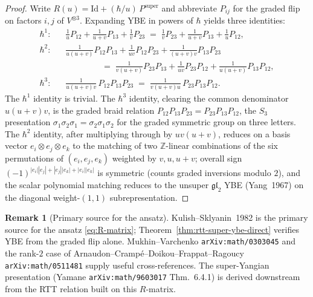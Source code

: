 \documentclass[11pt]{amsart}
\theoremstyle{definition}
\newtheorem{remark}[theorem]{Remark}
\providecommand{\bZ}{\mathbb{Z}}
\providecommand{\fgl}{\mathfrak{gl}}
\begin{document}
\begin{proof}
Write $R(u) = \mathrm{Id} + (\hbar/u)\, P^{\mathrm{super}}$ and abbreviate
$P_{ij}$ for the graded flip on factors $i, j$ of $V^{\otimes 3}$.
Expanding YBE in powers of $\hbar$ yields three identities:
\begin{align*}
\text{$\hbar^1$:}\quad &
  \tfrac{1}{u}P_{12} + \tfrac{1}{u+v}P_{13} + \tfrac{1}{v}P_{23}
  \;=\;
  \tfrac{1}{v}P_{23} + \tfrac{1}{u+v}P_{13} + \tfrac{1}{u}P_{12},
\\
\text{$\hbar^2$:}\quad &
  \tfrac{1}{u(u+v)}P_{12}P_{13} + \tfrac{1}{u v}P_{12}P_{23} + \tfrac{1}{(u+v) v}P_{13}P_{23}
  \\[-2pt]&\qquad\qquad
  \;=\;
  \tfrac{1}{v(u+v)}P_{23}P_{13} + \tfrac{1}{u v}P_{23}P_{12} + \tfrac{1}{u(u+v)}P_{13}P_{12},
\\
\text{$\hbar^3$:}\quad &
  \tfrac{1}{u(u+v)v}\, P_{12}P_{13}P_{23}
  \;=\;
  \tfrac{1}{v(u+v)u}\, P_{23}P_{13}P_{12}.
\end{align*}
The $\hbar^1$ identity is trivial. The $\hbar^3$ identity, clearing the
common denominator $u(u+v)v$, is the graded braid relation
$P_{12} P_{13} P_{23} = P_{23} P_{13} P_{12}$, the $S_3$ presentation
$\sigma_1 \sigma_2 \sigma_1 = \sigma_2 \sigma_1 \sigma_2$ for the graded
symmetric group on three letters. The $\hbar^2$ identity, after multiplying
through by $u v (u+v)$, reduces on a basis vector
$e_i \otimes e_j \otimes e_k$ to the matching of two $\bZ$-linear
combinations of the six permutations of $(e_i, e_j, e_k)$ weighted by
$v, u, u+v$; overall sign $(-1)^{|e_i||e_j| + |e_j||e_k| + |e_i||e_k|}$
is symmetric (counts graded inversions modulo $2$), and the scalar
polynomial matching reduces to the unsuper $\fgl_2$ YBE (Yang~1967) on
the diagonal weight-$(1,1)$ subrepresentation.
\end{proof}

\begin{remark}[Primary source for the ansatz]
\label{rem:ybe-direct-vs-citation}
Kulish--Sklyanin~1982 is the primary source for the ansatz
\eqref{eq:R-matrix}; Theorem~\ref{thm:rtt-super-ybe-direct} verifies YBE
from the graded flip alone. Mukhin--Varchenko \texttt{arXiv:math/0303045}
and the rank-$2$ case of Arnaudon--Cramp\'e--Doikou--Frappat--Ragoucy
\texttt{arXiv:math/0511481} supply useful cross-references. The
super-Yangian presentation (Yamane \texttt{arXiv:math/9603017} Thm.~6.4.1)
is derived downstream from the RTT relation built on this $R$-matrix.
\end{remark}
\end{document}
